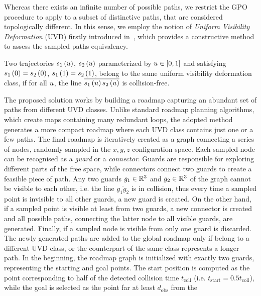 Whereas there exists an infinite number of possible paths, we restrict the GPO procedure to apply to a subset of distinctive paths, that
are considered topologically different. In this sense, we employ the notion of \emph{Uniform Visibility Deformation} (UVD) firstly introduced in~\cite{zhou2021raptor},
which provides a constructive method to assess the sampled paths equivalency.
\begin{definition}
    Two trajectories $s_1 \left( u \right)$, $s_2 \left( u \right)$ parameterized by $u \in \left[ 0,1 \right]$ and satisfying
    $s_1 \left( 0 \right) = s_2 \left( 0 \right)$, $s_1 \left( 1 \right) = s_2 \left( 1 \right)$, belong to the same uniform visibility deformation class,
    if for all $u$, the line $\overline{s_1 \left( u \right) s_2 \left( u \right)}$ is collision-free.
\end{definition}
The proposed solution works by building a roadmap capturing an abundant set of paths from different UVD classes.
Unlike standard roadmap planning algorithms, which create maps containing many redundant loops, the adopted method generates a more
compact roadmap where each UVD class contains just one or a few paths.
The final roadmap is iteratively created as a graph connecting a series of nodes, randomly sampled in the $x,y,z$ configuration space.
Each sampled node can be recognised as a \emph{guard} or a \emph{connector}. Guards are responsible for exploring different parts of the
free space, while connectors connect two guards to create a feasible piece of path.
Any two guards $g_1 \in \mathbb{R}^3$ and $g_2 \in \mathbb{R}^3$ of the graph cannot be visible to each other, i.e. the line $\overline{g_1 g_2}$ is in collision,
thus every time a sampled point is invisible to all other guards, a new guard is created. On the other hand, if a sampled point is visible at least from
two guards, a new connector is created and all possible paths, connecting the latter node to all visible guards, are generated.
Finally, if a sampled node is visible from only one guard is discarded.
The newly generated paths are added to the global roadmap only if belong to a different UVD class, or the counterpart of the same class
represents a longer path.
In the beginning, the roadmap graph is initialized with exactly two guards, representing the starting and goal points.
The start position is computed as the point corresponding to half of the detected collision time $t_{\text{coll}}$
(i.e. $t_{\text{start}} = 0.5t_{\text{coll}}$), while the goal is selected as the point far at least $d_{\text{obs}}$ from the
